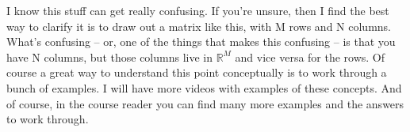 \documentclass[fleqn,10pt]{olplainarticle}
\theoremstyle{definition}
\theoremstyle{remark}
\begin{document}
I know this stuff can get really confusing. If you're unsure, then I find the best way to clarify it is to draw out a matrix like this, with M rows and N columns. What's confusing -- or, one of the things that makes this confusing -- is that you have N columns, but those columns live in $\mathbb{R}^M$ and vice versa for the rows. Of course a great way to understand this point conceptually is to work through a bunch of examples. I will have more videos with examples of these concepts. And of course, in the course reader you can find many more examples and the answers to work through.
\end{document}
